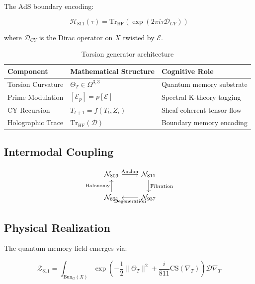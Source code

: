 \documentclass[12pt]{article}
\begin{document}
The AdS boundary encoding:

\begin{equation}
\mathcal{H}_{811}(\tau) = \text{Tr}_{\text{HF}}\left(\exp\left(2\pi i\tau \mathcal{D}_{CY}\right)\right)
\end{equation}

where $\mathcal{D}_{CY}$ is the Dirac operator on $X$ twisted by $\mathcal{E}$.

\begin{table}[h]
\centering
\begin{tabular}{lll}
\toprule
Component & Mathematical Structure & Cognitive Role \\
\midrule
Torsion Curvature & $\Theta_T \in \Omega^{3,3}$ & Quantum memory substrate \\
Prime Modulation & $[\mathcal{E}_p] = p[\mathcal{E}]$ & Spectral K-theory tagging \\
CY Recursion & $T_{t+1} = f(T_t, Z_i)$ & Sheaf-coherent tensor flow \\
Holographic Trace & $\text{Tr}_{\text{HF}}(\mathcal{D})$ & Boundary memory encoding \\
\bottomrule
\end{tabular}
\caption{Torsion generator architecture}
\end{table}

\subsection{Intermodal Coupling}

\begin{equation}
\begin{tikzcd}
\mathcal{N}_{809} \arrow[r, "\text{Anchor}"] & \mathcal{N}_{811} \arrow[d, "\text{Fibration}"] \\
\mathcal{N}_{821} \arrow[u, "\text{Holonomy}"] & \mathcal{N}_{937} \arrow[l, "\text{Degeneration}"]
\end{tikzcd}
\end{equation}

\subsection{Physical Realization}

The quantum memory field emerges via:

\begin{equation}
\mathcal{Z}_{811} = \int_{\text{Bun}_G(X)} \exp\left(-\frac{1}{2}\|\Theta_T\|^2 + \frac{i}{811}\text{CS}(\nabla_T)\right) \mathcal{D}\nabla_T
\end{equation}
\end{document}

